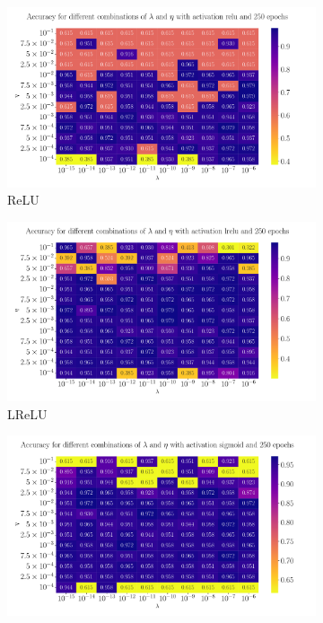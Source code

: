 \documentclass[%
reprint,s
amsmath,amssymb,
aps,
]{revtex4-2}
\begin{document}
\begin{figure}[ht!]
	\begin{subfigure}{0.4353\textwidth}
		\includegraphics[width=\textwidth]{Python/Figures/Cancer_Accuracy_Heatmap_relu_Epochs250.pdf}
		\caption{ReLU}
		\label{fig:ReLU_heatmap}
	\end{subfigure}
	\hfill
	\begin{subfigure}{0.4353\textwidth}
		\includegraphics[width=\textwidth]{Python/Figures/Cancer_Accuracy_Heatmap_lrelu_Epochs250.pdf}
		\caption{LReLU}
		\label{fig:LReLU_heatmap}
	\end{subfigure}
	\hfill\newline
	\begin{subfigure}{0.4353\textwidth}
		\includegraphics[width=\textwidth]{Python/Figures/Cancer_Accuracy_Heatmap_sigmoid_Epochs250.pdf}

\end{subfigure}
\end{figure}
\end{document}
